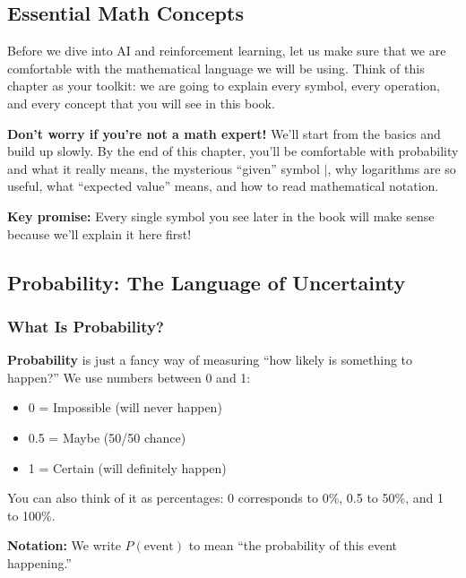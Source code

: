 \begin{chapterenv}

\chapter{Essential Math Concepts}

Before we dive into AI and reinforcement learning, let us make sure that we are comfortable with the mathematical language we will be using. Think of this chapter as your toolkit: we are going to explain every symbol, every operation, and every concept that you will see in this book.

\begin{infobox}
\textbf{Don't worry if you're not a math expert!} We'll start from the basics and build up slowly. By the end of this chapter, you'll be comfortable with probability and what it really means, the mysterious ``given'' symbol $|$, why logarithms are so useful, what ``expected value'' means, and how to read mathematical notation.

\textbf{Key promise:} Every single symbol you see later in the book will make sense because we'll explain it here first!
\end{infobox}

\section{Probability: The Language of Uncertainty}

\subsection{What Is Probability?}

\textbf{Probability} is just a fancy way of measuring ``how likely is something to happen?'' We use numbers between 0 and 1:

\begin{itemize}[nosep]
    \item 0 = Impossible (will never happen)
    \item 0.5 = Maybe (50/50 chance)
    \item 1 = Certain (will definitely happen)
\end{itemize}

You can also think of it as percentages: 0 corresponds to 0\%, 0.5 to 50\%, and 1 to 100\%.

\textbf{Notation:} We write $P(\text{event})$ to mean ``the probability of this event happening.''


\end{chapterenv}
